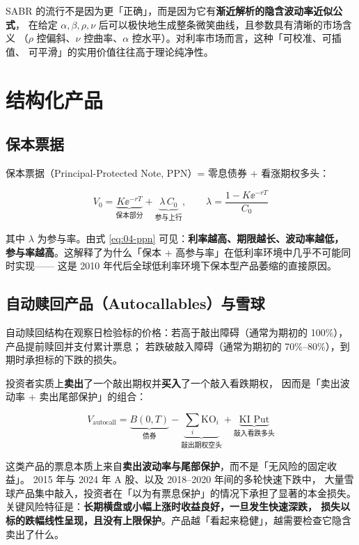 SABR 的流行不是因为更「正确」，而是因为它有\textbf{渐近解析的隐含波动率近似公式}，
在给定 $\alpha,\beta,\rho,\nu$ 后可以极快地生成整条微笑曲线，且参数具有清晰的市场含义
（$\rho$ 控偏斜、$\nu$ 控曲率、$\alpha$ 控水平）。对利率市场而言，这种「可校准、可插值、
可平滑」的实用价值往往高于理论纯净性。

\section{结构化产品}

\subsection{保本票据}

保本票据（Principal-Protected Note, PPN）= 零息债券 + 看涨期权多头：

\begin{equation}
  V_0 = \underbrace{K\ee^{-rT}}_{\text{保本部分}}
      + \underbrace{\lambda\,C_0}_{\text{参与上行}},\qquad
  \lambda = \frac{1 - K\ee^{-rT}}{C_0}
  \label{eq:04-ppn}
\end{equation}

其中 $\lambda$ 为参与率。由式 \cref{eq:04-ppn} 可见：\textbf{利率越高、期限越长、波动率越低，
参与率越高}。这解释了为什么「保本 + 高参与率」在低利率环境中几乎不可能同时实现——
这是 2010 年代后全球低利率环境下保本型产品萎缩的直接原因。

\subsection{自动赎回产品（Autocallables）与雪球}

自动赎回结构在观察日检验标的价格：若高于敲出障碍（通常为期初的 100\%），产品提前赎回并支付累计票息；
若跌破敲入障碍（通常为期初的 70\%--80\%），到期时承担标的下跌的损失。

投资者实质上\textbf{卖出}了一个敲出期权并\textbf{买入}了一个敲入看跌期权，
因而是「卖出波动率 + 卖出尾部保护」的组合：

\begin{equation}
  V_{\text{autocall}} = \underbrace{B(0,T)}_{\text{债券}}
    - \underbrace{\sum_i \text{KO}_i}_{\text{敲出期权空头}}
    + \underbrace{\text{KI Put}}_{\text{敲入看跌多头}}
  \label{eq:04-autocall}
\end{equation}

\begin{warningbox}[雪球类产品的真实风险]
这类产品的票息本质上来自\textbf{卖出波动率与尾部保护}，而不是「无风险的固定收益」。
2015 年与 2024 年 A 股、以及 2018--2020 年间的多轮快速下跌中，
大量雪球产品集中敲入，投资者在「以为有票息保护」的情况下承担了显著的本金损失。
关键风险特征是：\textbf{长期横盘或小幅上涨时收益良好，一旦发生快速深跌，
损失以标的跌幅线性呈现，且没有上限保护}。产品越「看起来稳健」，越需要检查它隐含卖出了什么。
\end{warningbox}

